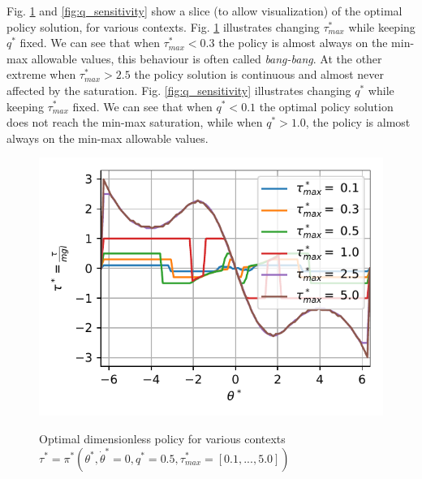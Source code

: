 Fig. \ref{fig:torque_sensitivity} and \ref{fig:q_sensitivity} show a slice (to allow visualization) of the optimal policy solution, for various contexts. Fig. \ref{fig:torque_sensitivity} illustrates changing $\tau_{max}^*$ while keeping $q^*$ fixed. We can see that when $\tau_{max}^*<0.3$ the policy is almost always on the min-max allowable values, this behaviour is often called \textit{bang-bang}. At the other extreme when 
$\tau_{max}^*>2.5$ the policy solution is continuous and almost never affected by the saturation. Fig. \ref{fig:q_sensitivity} illustrates changing $q^*$ while keeping $\tau_{max}^*$ fixed. We can see that when $q^*<0.1$ the optimal policy solution does not reach the min-max saturation, while when $q^*>1.0$, the policy is almost always on the min-max allowable values.%
\begin{figure}[ht]
\begin{center}
\includegraphics[width=0.99\linewidth]{fig/qs05.pdf}
\caption{Optimal dimensionless policy for various contexts $\tau^* = \pi^*( \theta^* , \dot{\theta}^* = 0 , q^* = 0.5 , \tau^*_{max} = [0.1, ... , 5.0] )$}
\vspace{-10pt}
\label{fig:torque_sensitivity}
\end{center}
\end{figure}
